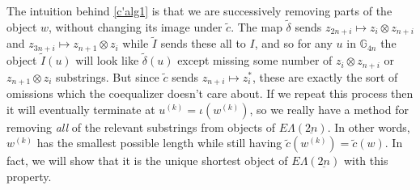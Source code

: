 \documentclass{amsbook} %
\newcommand{\ELnn}{E\Lambda(\underline{2n})}
\numberwithin{section}{chapter}
\begin{document}
The intuition behind \cref{c'alg1} is that we are successively removing parts of the object $w$, without changing its image under $\tilde{c}$. The map $\tilde{\delta}$ sends $z_{2n+i} \mapsto z_i \otimes z_{n+i}$ and $z_{3n+i} \mapsto z_{n+1} \otimes z_i$ while $\tilde{I}$ sends these all to $I$, and so for any $u$ in $\mathbb{G}_{4n}$ the object $\tilde{I}(u)$ will look like $\tilde{\delta}(u)$ except missing some number of $z_i \otimes z_{n+i}$ or $z_{n+1} \otimes z_i$ substrings. But since $\tilde{c}$ sends $z_{n+i} \mapsto z_i^*$, these are exactly the sort of omissions which the coequalizer doesn't care about. If we repeat this process then it will eventually terminate at $u^{(k)} = \iota(w^{(k)})$, so we really have a method for removing \emph{all} of the relevant substrings from objects of $\ELnn$. In other words, $w^{(k)}$ has the smallest possible length while still having $\tilde{c}(w^{(k)}) = \tilde{c}(w)$. In fact, we will show that it is the unique shortest object of $\ELnn$ with this property.
\end{document}
